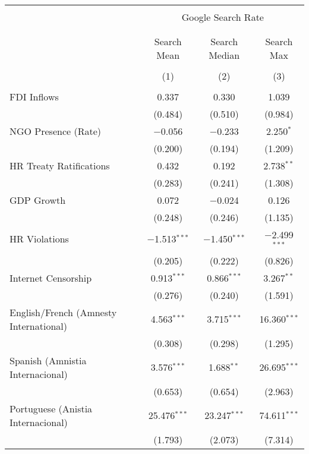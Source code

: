 
\begin{table}[!htbp] \centering 
  \caption{} 
  \label{} 
\begin{tabular}{@{\extracolsep{5pt}}lccc} 
\\[-1.8ex]\hline 
\hline \\[-1.8ex] 
 & \multicolumn{3}{c}{Google Search Rate} \\ 
\cline{2-4} 
\\[-1.8ex] & \multicolumn{3}{c}{ } \\ 
 & Search Mean & Search Median & Search Max \\ 
\\[-1.8ex] & (1) & (2) & (3)\\ 
\hline \\[-1.8ex] 
 FDI Inflows & 0.337 & 0.330 & 1.039 \\ 
  & (0.484) & (0.510) & (0.984) \\ 
  NGO Presence (Rate) & $-$0.056 & $-$0.233 & 2.250$^{*}$ \\ 
  & (0.200) & (0.194) & (1.209) \\ 
  HR Treaty Ratifications & 0.432 & 0.192 & 2.738$^{**}$ \\ 
  & (0.283) & (0.241) & (1.308) \\ 
  GDP Growth & 0.072 & $-$0.024 & 0.126 \\ 
  & (0.248) & (0.246) & (1.135) \\ 
  HR Violations & $-$1.513$^{***}$ & $-$1.450$^{***}$ & $-$2.499$^{***}$ \\ 
  & (0.205) & (0.222) & (0.826) \\ 
  Internet Censorship & 0.913$^{***}$ & 0.866$^{***}$ & 3.267$^{**}$ \\ 
  & (0.276) & (0.240) & (1.591) \\ 
  English/French (Amnesty International) & 4.563$^{***}$ & 3.715$^{***}$ & 16.360$^{***}$ \\ 
  & (0.308) & (0.298) & (1.295) \\ 
  Spanish (Amnistia Internacional) & 3.576$^{***}$ & 1.688$^{**}$ & 26.695$^{***}$ \\ 
  & (0.653) & (0.654) & (2.963) \\ 
  Portuguese (Anistia Internacional) & 25.476$^{***}$ & 23.247$^{***}$ & 74.611$^{***}$ \\ 
  & (1.793) & (2.073) & (7.314) \\ 

\end{tabular}
\end{table}
